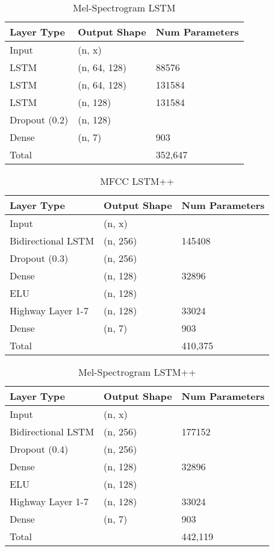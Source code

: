 \begin{table}[ht]
\caption{Mel-Spectrogram LSTM}
\centering
\begin{tabular}{l|l|l}
Layer Type & Output Shape & Num Parameters \\ \hline
Input & (n, x) & \\
LSTM & (n, 64, 128) & 88576\\
LSTM & (n, 64, 128) & 131584\\
LSTM & (n, 128) & 131584\\
Dropout (0.2) & (n, 128) & \\
Dense   & (n, 7) & 903\\
\hline
\hline
Total   & \ & 352,647\\
\end{tabular}
\end{table}

\begin{table}[ht]
\caption{MFCC LSTM++}
\centering
\begin{tabular}{l|l|l}
Layer Type & Output Shape & Num Parameters \\ \hline
Input & (n, x) & \\
Bidirectional LSTM & (n, 256) & 145408\\
Dropout (0.3) & (n, 256) & \\
Dense & (n, 128) & 32896\\
ELU & (n, 128) &\\
Highway Layer 1-7 & (n, 128) & 33024\\
Dense   & (n, 7) & 903\\
\hline
\hline
Total   & \ & 410,375\\
\end{tabular}
\end{table}

\begin{table}[ht]
\caption{Mel-Spectrogram LSTM++}
\centering
\begin{tabular}{l|l|l}
Layer Type & Output Shape & Num Parameters \\ \hline
Input & (n, x) & \\
Bidirectional LSTM & (n, 256) & 177152\\
Dropout (0.4) & (n, 256) & \\
Dense & (n, 128) & 32896\\
ELU & (n, 128) &\\
Highway Layer 1-7 & (n, 128) & 33024\\
Dense   & (n, 7) & 903\\
\hline
\hline
Total   & \ & 442,119\\
\end{tabular}
\end{table}

